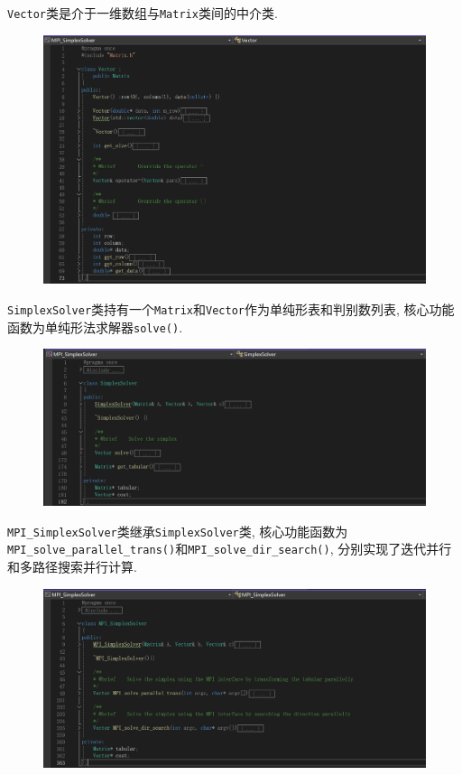 \documentclass[UTF8,a4paper,10pt]{ctexart}
\begin{document}
\par
\texttt{Vector}类是介于一维数组与\texttt{Matrix}类间的中介类.
\begin{figure}[htbp]
    \centering
    \includegraphics[width=14cm]{Vector.png}
\end{figure}
\par
\texttt{SimplexSolver}类持有一个\texttt{Matrix}和\texttt{Vector}作为单纯形表和判别数列表, 核心功能函数为单纯形法求解器\texttt{solve()}.
\begin{figure}[htbp]
    \centering
    \includegraphics[width=14cm]{SimplexSolver.png}
\end{figure}
\par
\texttt{MPI\_SimplexSolver}类继承\texttt{SimplexSolver}类, 核心功能函数为\texttt{MPI\_solve\_parallel\_trans()}和\texttt{MPI\_solve\_dir\_search()}, 分别实现了迭代并行和多路径搜索并行计算.
\begin{figure}[htbp]
    \centering
    \includegraphics[width=14cm]{MPI_SimplexSolver.png}
\end{figure}
\end{document}
